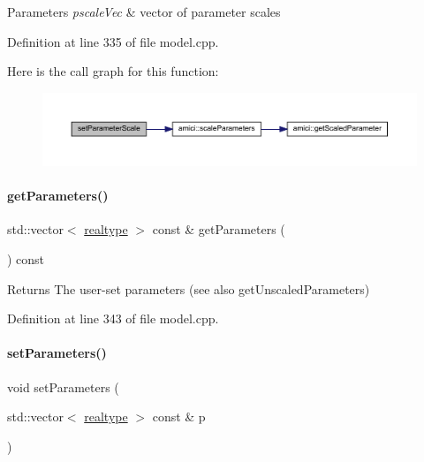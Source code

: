 \begin{DoxyParams}{Parameters}
{\em pscale\+Vec} & vector of parameter scales \\
\hline
\end{DoxyParams}


Definition at line 335 of file model.\+cpp.

Here is the call graph for this function\+:
\nopagebreak
\begin{figure}[H]
\begin{center}
\leavevmode
\includegraphics[width=350pt]{classamici_1_1_model_a5bff74aa6d87148a2cf0943ca1dbd49d_cgraph}
\end{center}
\end{figure}
\mbox{\label{classamici_1_1_model_a1bb7ee08df1e2e42da7dceb2100b6131}} 
\paragraph{\texorpdfstring{getParameters()}{getParameters()}}
{\footnotesize\ttfamily std\+::vector$<$ \mbox{\hyperlink{namespaceamici_a1bdce28051d6a53868f7ccbf5f2c14a3}{realtype}} $>$ const  \& get\+Parameters (\begin{DoxyParamCaption}{ }\end{DoxyParamCaption}) const}

\begin{DoxyReturn}{Returns}
The user-\/set parameters (see also get\+Unscaled\+Parameters) 
\end{DoxyReturn}


Definition at line 343 of file model.\+cpp.

\mbox{\label{classamici_1_1_model_af1e95f6479d442fcb4c63d16763d4acd}} 
\paragraph{\texorpdfstring{setParameters()}{setParameters()}}
{\footnotesize\ttfamily void set\+Parameters (\begin{DoxyParamCaption}\item[{std\+::vector$<$ \mbox{\hyperlink{namespaceamici_a1bdce28051d6a53868f7ccbf5f2c14a3}{realtype}} $>$ const \&}]{p }\end{DoxyParamCaption})}


